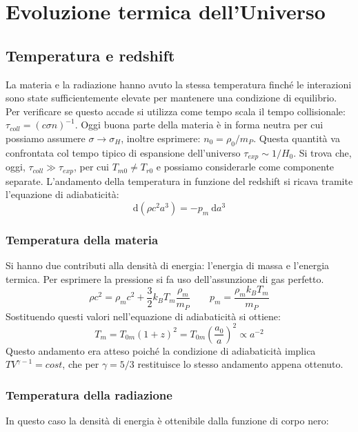 \chapter{Evoluzione termica dell'Universo}\label{3:ch}


\section{Temperatura e redshift}
La materia e la radiazione hanno avuto la stessa temperatura finché le interazioni sono state sufficientemente elevate per mantenere una condizione di equilibrio. Per verificare se questo accade si utilizza come tempo scala il tempo collisionale: $\tau_{coll}=(c\sigma n)^{-1}$. Oggi buona parte della materia è in forma neutra per cui possiamo assumere $\sigma \rightarrow \sigma_H$, inoltre  esprimere: $n_0 = \rho_0 / m_P$. Questa quantità va confrontata col tempo tipico di espansione dell'universo $\tau_{exp} \sim 1/H_0$. Si trova che, oggi, $\tau_{coll} \gg \tau_{exp}$, per cui $T_{m0} \neq T_{r0}$ e possiamo considerarle come componente separate.
L'andamento della temperatura in funzione del redshift si ricava tramite l'equazione di adiabaticità:
$$
\mathrm{d}(\rho c^2 a^3) = - p_m\: \mathrm{d}a^3
$$




\subsection{Temperatura della materia}
Si hanno due contributi alla densità di energia: l'energia di massa e l'energia termica. Per esprimere la pressione si fa uso dell'assunzione di gas perfetto. 
$$
 \rho c^2 = \rho_m c^2 + \frac{3}{2}k_B T_m \frac{\rho_m}{m_P} \qquad p_m = \frac{\rho_m k_B T_m}{m_P}
$$
Sostituendo questi valori nell'equazione di adiabaticità si ottiene:
\begin{equation}
    T_m = T_{0m} (1+z)^2 = T_{0m}\left ( \frac{a_0}{a}\right )^2  \propto a^{-2}
\end{equation}
Questo andamento era atteso poiché la condizione di adiabaticità implica $TV^{\gamma -1} = cost$, che per $\gamma=5/3$ restituisce lo stesso andamento appena ottenuto.

\subsection{Temperatura della radiazione}
In questo caso la densità di energia è ottenibile dalla funzione di corpo nero:

